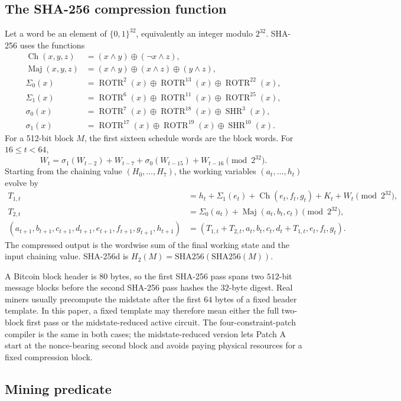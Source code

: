 \documentclass[11pt]{article}
\theoremstyle{definition}
\theoremstyle{remark}
\newcommand{\bits}{\{0,1\}}
\newcommand{\sha}{\mathrm{SHA256}}
\newcommand{\rot}{\operatorname{ROTR}}
\newcommand{\shr}{\operatorname{SHR}}
\newcommand{\Ch}{\operatorname{Ch}}
\newcommand{\Maj}{\operatorname{Maj}}
\begin{document}
\subsection{The SHA-256 compression function}

Let a word be an element of \(\bits^{32}\), equivalently an integer modulo
\(2^{32}\). SHA-256 uses the functions
\[
\begin{aligned}
\Ch(x,y,z)&=(x\wedge y)\oplus(\neg x\wedge z),\\
\Maj(x,y,z)&=(x\wedge y)\oplus(x\wedge z)\oplus(y\wedge z),\\
\Sigma_0(x)&=\rot^2(x)\oplus\rot^{13}(x)\oplus\rot^{22}(x),\\
\Sigma_1(x)&=\rot^6(x)\oplus\rot^{11}(x)\oplus\rot^{25}(x),\\
\sigma_0(x)&=\rot^7(x)\oplus\rot^{18}(x)\oplus\shr^3(x),\\
\sigma_1(x)&=\rot^{17}(x)\oplus\rot^{19}(x)\oplus\shr^{10}(x).
\end{aligned}
\]
For a 512-bit block \(M\), the first sixteen schedule words are the block words.
For \(16\le t<64\),
\[
W_t=\sigma_1(W_{t-2})+W_{t-7}+\sigma_0(W_{t-15})+W_{t-16}\pmod {2^{32}}.
\]
Starting from the chaining value \((H_0,\ldots,H_7)\), the working variables
\((a_t,\ldots,h_t)\) evolve by
\[
\begin{aligned}
T_{1,t}&=h_t+\Sigma_1(e_t)+\Ch(e_t,f_t,g_t)+K_t+W_t\pmod {2^{32}},\\
T_{2,t}&=\Sigma_0(a_t)+\Maj(a_t,b_t,c_t)\pmod {2^{32}},\\
(a_{t+1},b_{t+1},c_{t+1},d_{t+1},e_{t+1},f_{t+1},g_{t+1},h_{t+1})
&=(T_{1,t}+T_{2,t},a_t,b_t,c_t,d_t+T_{1,t},e_t,f_t,g_t).
\end{aligned}
\]
The compressed output is the wordwise sum of the final working state and the
input chaining value. SHA-256d is \(H_2(M)=\sha(\sha(M))\).

A Bitcoin block header is \(80\) bytes, so the first SHA-256 pass spans two
\(512\)-bit message blocks before the second SHA-256 pass hashes the
\(32\)-byte digest. Real miners usually precompute the midstate after the first
\(64\) bytes of a fixed header template. In this paper, a fixed template may
therefore mean either the full two-block first pass or the midstate-reduced
active circuit. The four-constraint-patch compiler is the same in both cases; the
midstate-reduced version lets Patch A start at the nonce-bearing second block
and avoids paying physical resources for a fixed compression block.

\subsection{Mining predicate}
\end{document}
